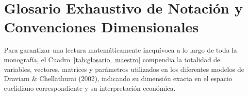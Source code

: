 \documentclass[11pt,a4paper]{report}
\numberwithin{equation}{chapter}
\begin{document}
\newpage
\tableofcontents
\newpage

\chapter*{Glosario Exhaustivo de Notación y Convenciones Dimensionales}

Para garantizar una lectura matemáticamente inequívoca a lo largo de toda la monografía, el Cuadro~\ref{tab:glosario_maestro} compendia la totalidad de variables, vectores, matrices y parámetros utilizados en los diferentes modelos de Draviam \& Chellathurai (2002), indicando su dimensión exacta en el espacio euclidiano correspondiente y su interpretación económica.
\end{document}
